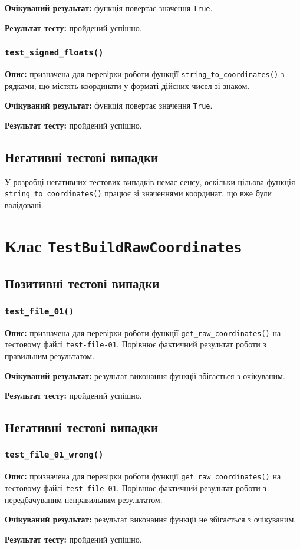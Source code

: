\documentclass[a4paper,oneside,DIV=12,12pt]{scrartcl}
\newcommand{\classname}[1]{\texttt{#1}}
\newcommand{\funcname}[1]{\texttt{#1}}
\newcommand{\caseattrib}[1]{\noindent\textbf{#1}}
\newcommand{\printtrue}{\texttt{True}}
\newcommand{\filename}[1]{\texttt{#1}}
\begin{document}
				\caseattrib{Очікуваний результат:} функція повертає значення \printtrue.
				
				\caseattrib{Результат тесту:} пройдений успішно.
				
			\subsubsection{\funcname{test\_signed\_floats()}}
				\caseattrib{Опис:} призначена для перевірки роботи функції \verb|string_to_coordinates()| з рядками, що містять координати у форматі дійсних чисел зі знаком.
				
				\caseattrib{Очікуваний результат:} функція повертає значення \printtrue.
				
				\caseattrib{Результат тесту:} пройдений успішно.
				
		\subsection{Негативні тестові випадки}
			У розробці негативних тестових випадків немає сенсу, оскільки цільова функція \verb|string_to_coordinates()| працює зі значеннями координат, що вже були валідовані.
			
	\section{Клас \classname{TestBuildRawCoordinates}}
		\subsection{Позитивні тестові випадки}
			\subsubsection{\funcname{test\_file\_01()}}
				\caseattrib{Опис:} призначена для перевірки роботи функції \verb|get_raw_coordinates()| на тестовому файлі \filename{test-file-01}. Порівнює фактичний результат роботи з правильним результатом.
				
				\caseattrib{Очікуваний результат:} результат виконання функції збігається з очікуваним.
				
				\caseattrib{Результат тесту:} пройдений успішно.
			
		\subsection{Негативні тестові випадки}
			\subsubsection{\funcname{test\_file\_01\_wrong()}}
				\caseattrib{Опис:} призначена для перевірки роботи функції \verb|get_raw_coordinates()| на тестовому файлі \filename{test-file-01}. Порівнює фактичний результат роботи з передбачуваним неправильним результатом.
				
				\caseattrib{Очікуваний результат:} результат виконання функції не збігається з очікуваним.
				
				\caseattrib{Результат тесту:} пройдений успішно.
\end{document}
